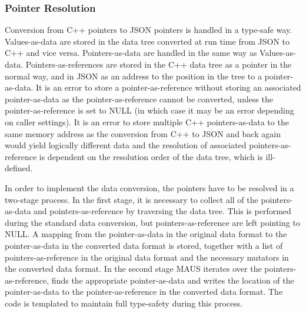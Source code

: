 \subsubsection{Pointer Resolution}
Conversion from C++ pointers to JSON pointers is handled in a type-safe way. Values-as-data are stored in the data tree converted at run time from JSON to C++ and vice versa. Pointers-as-data are handled in the same way as Values-as-data. Pointers-as-references are stored in the C++ data tree as a pointer in the normal way, and in JSON as an address to the position in the tree to a pointer-as-data. It is an error to store a pointer-as-reference without storing an associated pointer-as-data as the pointer-as-reference cannot be converted, unless the pointer-as-reference is set to NULL (in which case it may be an error depending on caller settings). It is an error to store multiple C++ pointers-as-data to the same memory address as the conversion from C++ to JSON and back again would yield logically different data and the resolution of associated pointers-as-reference is dependent on the resolution order of the data tree, which is ill-defined.

In order to implement the data conversion, the pointers have to be resolved in a two-stage process. In the first stage, it is necessary to collect all of the pointers-as-data and pointers-as-reference by traversing the data tree. This is performed during the standard data conversion, but pointers-as-reference are left pointing to NULL. A mapping from the pointer-as-data in the original data format to the pointer-as-data in the converted data format is stored, together with a list of pointers-as-reference in the original data format and the necessary mutators in the converted data format. In the second stage MAUS iterates over the pointers-as-reference, finds the appropriate pointer-as-data and writes the location of the pointer-as-data to the pointer-as-reference in the converted data format. The code is templated to maintain full type-safety during this process.
 
